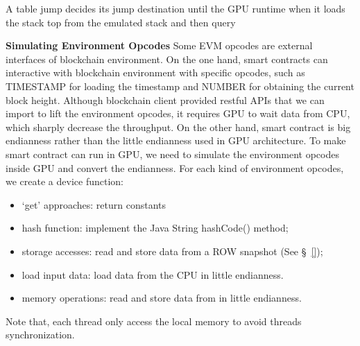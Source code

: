 A table jump decides its jump destination until the GPU runtime when it loads the stack top from the emulated stack and then query



\noindent \textbf{Simulating Environment Opcodes}
Some EVM opcodes are external interfaces of blockchain environment.
On the one hand, smart contracts can interactive with blockchain environment with specific opcodes, such as TIMESTAMP for loading the timestamp and NUMBER for obtaining the current block height. Although blockchain client provided restful APIs that we can import to lift the environment opcodes, it requires GPU to wait data from CPU, which sharply decrease the {\tool} throughput.
%
On the other hand, smart contract is big endianness rather than the little endianness used in GPU architecture. 
To make smart contract can run in GPU, we need to simulate the environment opcodes inside GPU and convert the endianness. 
For each kind of environment opcodes, we create a device function:
\begin{itemize}
    \item `get' approaches: return constants
    \item hash function: implement the Java String hashCode() method;
    \item storage accesses: read and store data from a ROW snapshot (See \S~\ref{});
    \item load input data: load data from the CPU in little endianness.
    \item memory operations: read and store data from  in little endianness.
\end{itemize}

Note that, each thread only access the local memory to avoid threads synchronization.


